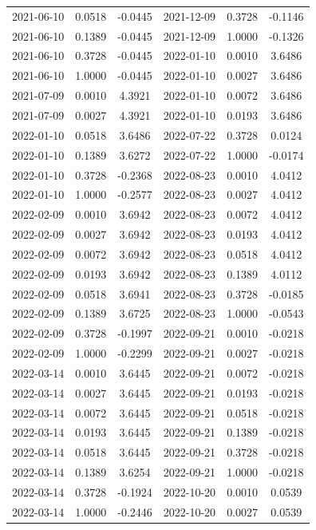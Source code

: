 \begin{footnotesize}
\begin{longtable}{lcc|lcc}
2021-06-10 & 0.0518 & -0.0445 & 2021-12-09 & 0.3728 & -0.1146 \\
2021-06-10 & 0.1389 & -0.0445 & 2021-12-09 & 1.0000 & -0.1326 \\
2021-06-10 & 0.3728 & -0.0445 & 2022-01-10 & 0.0010 & 3.6486 \\
2021-06-10 & 1.0000 & -0.0445 & 2022-01-10 & 0.0027 & 3.6486 \\
2021-07-09 & 0.0010 & 4.3921 & 2022-01-10 & 0.0072 & 3.6486 \\
2021-07-09 & 0.0027 & 4.3921 & 2022-01-10 & 0.0193 & 3.6486 \\
2022-01-10 & 0.0518 & 3.6486 & 2022-07-22 & 0.3728 & 0.0124 \\
2022-01-10 & 0.1389 & 3.6272 & 2022-07-22 & 1.0000 & -0.0174 \\
2022-01-10 & 0.3728 & -0.2368 & 2022-08-23 & 0.0010 & 4.0412 \\
2022-01-10 & 1.0000 & -0.2577 & 2022-08-23 & 0.0027 & 4.0412 \\
2022-02-09 & 0.0010 & 3.6942 & 2022-08-23 & 0.0072 & 4.0412 \\
2022-02-09 & 0.0027 & 3.6942 & 2022-08-23 & 0.0193 & 4.0412 \\
2022-02-09 & 0.0072 & 3.6942 & 2022-08-23 & 0.0518 & 4.0412 \\
2022-02-09 & 0.0193 & 3.6942 & 2022-08-23 & 0.1389 & 4.0112 \\
2022-02-09 & 0.0518 & 3.6941 & 2022-08-23 & 0.3728 & -0.0185 \\
2022-02-09 & 0.1389 & 3.6725 & 2022-08-23 & 1.0000 & -0.0543 \\
2022-02-09 & 0.3728 & -0.1997 & 2022-09-21 & 0.0010 & -0.0218 \\
2022-02-09 & 1.0000 & -0.2299 & 2022-09-21 & 0.0027 & -0.0218 \\
2022-03-14 & 0.0010 & 3.6445 & 2022-09-21 & 0.0072 & -0.0218 \\
2022-03-14 & 0.0027 & 3.6445 & 2022-09-21 & 0.0193 & -0.0218 \\
2022-03-14 & 0.0072 & 3.6445 & 2022-09-21 & 0.0518 & -0.0218 \\
2022-03-14 & 0.0193 & 3.6445 & 2022-09-21 & 0.1389 & -0.0218 \\
2022-03-14 & 0.0518 & 3.6445 & 2022-09-21 & 0.3728 & -0.0218 \\
2022-03-14 & 0.1389 & 3.6254 & 2022-09-21 & 1.0000 & -0.0218 \\
2022-03-14 & 0.3728 & -0.1924 & 2022-10-20 & 0.0010 & 0.0539 \\
2022-03-14 & 1.0000 & -0.2446 & 2022-10-20 & 0.0027 & 0.0539 \\

\end{longtable}
\end{footnotesize}
